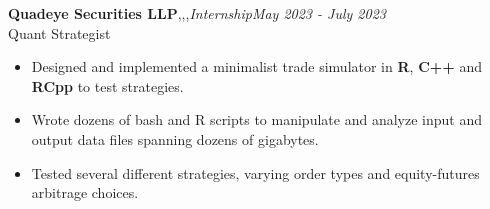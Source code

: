 \textbf{Quadeye Securities LLP}\sep\cpp\sep\Rlang\sep{\it Internship}\hfill {\sl \small May 2023 - July 2023}\\
\vspace{-5pt}
\emerrow Quant Strategist
\begin{itemize}[itemsep = -1.3 mm, leftmargin=*]
\item Designed and implemented a minimalist trade simulator in \textbf{R}, \textbf{C++} and \textbf{RCpp} to test strategies.
\item Wrote dozens of bash and R scripts to manipulate and analyze input and output data files spanning dozens of gigabytes.
\item Tested several different strategies, varying order types and equity-futures arbitrage choices.
\end{itemize}